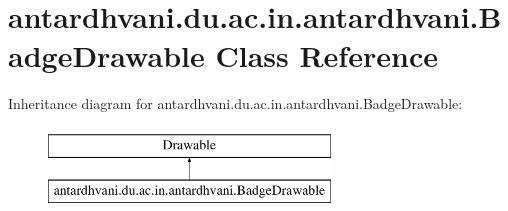 \hypertarget{classantardhvani_1_1du_1_1ac_1_1in_1_1antardhvani_1_1_badge_drawable}{}\section{antardhvani.\+du.\+ac.\+in.\+antardhvani.\+Badge\+Drawable Class Reference}
\label{classantardhvani_1_1du_1_1ac_1_1in_1_1antardhvani_1_1_badge_drawable}
Inheritance diagram for antardhvani.\+du.\+ac.\+in.\+antardhvani.\+Badge\+Drawable\+:\begin{figure}[H]
\begin{center}
\leavevmode
\includegraphics[height=2.000000cm]{classantardhvani_1_1du_1_1ac_1_1in_1_1antardhvani_1_1_badge_drawable}
\end{center}
\end{figure}
